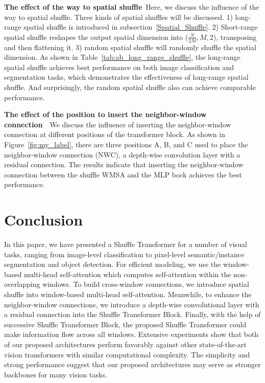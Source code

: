 \documentclass{article}
\begin{document}
\textbf{The effect of the way to spatial shuffle}~Here, we discuss the influence of the way to spatial shuffle. Three kinds of spatial shuffles will be discussed. 1) long-range spatial shuffle is introduced in subsection~\ref{Spatial_Shuffle}. 2) Short-range spatial shuffle reshapes the output spatial dimension into ($\frac{N}{2M}, M, 2$), transposing and then flattening it. 3) random spatial shuffle will randomly shuffle the spatial dimension. As shown in Table~\ref{tab:ab_long_range_shuffle}, the long-range spatial shuffle achieves best performance on both image classification and segmentation tasks, which demonstrates the effectiveness of long-range spatial shuffle. And surprisingly, the random spatial shuffle also can achieve comparable performance.

\textbf{The effect of the position to insert the neighbor-window connection}~~We discuss the influence of inserting the neighbor-window connection at different positions of the transformer block. As shown in Figure~\ref{fig:my_label}, there are three positions A, B, and C used to place the neighbor-window connection (NWC), a depth-wise convolution layer with a residual connection.  The results indicate that inserting the neighbor-window connection between the shuffle WMSA and the MLP bock achieves the best performance.







\section{Conclusion}
In this paper, we have presented a Shuffle Transformer for a number of visual tasks, ranging from image-level
classification to pixel-level semantic/instance segmentation and object detection. For efficient modeling, we use the window-based multi-head self-attention which computes self-attention within the non-overlapping windows. To build cross-window connections, we introduce spatial shuffle into window-based multi-head self-attention. Meanwhile, to enhance the neighbor-window connections, we introduce a depth-wise convolutional layer with a residual connection into the Shuffle Transformer Block. Finally, with the help of successive Shuffle Transformer Block, the proposed Shuffle Transformer could make information flow across all windows. Extensive experiments show that both of our proposed architectures perform favorably against other state-of-the-art vision transformers with similar computational complexity. The simplicity and strong performance suggest that our proposed architectures may serve as stronger backbones for many vision tasks.

{\small


}
\end{document}
